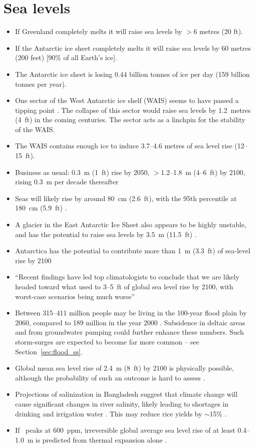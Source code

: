 \documentclass[11pt]{article}
\begin{document}
\section{Sea levels}
\begin{itemize}
\item If Greenland completely melts it will raise sea levels by $>$6 metres (20 ft).
\item If the Antarctic ice sheet completely melts it will raise sea levels by 60 metres (200 feet) [90\% of all Earth's ice].
\item The Antarctic ice sheet is losing 0.44 billion tonnes of ice per day (159 billion tonnes per year). \cite{Mcmillan14} 
\item One sector of the West Antarctic ice shelf (WAIS) seems to have passed a tipping point \cite{Rignot14}. The collapse of this sector would raise sea levels by 1.2~metres (4~ft) in the coming centuries. The sector acts as a linchpin for the stability of the WAIS.
\item The WAIS contains enough ice to induce 3.7--4.6 metres of sea level rise (12--15~ft).
\item Business as usual: 0.3~m (1~ft) rise by 2050, $>$1.2--1.8~m (4--6~ft) by 2100, rising 0.3~m per decade thereafter
\item Seas will likely rise by around 80~cm (2.6~ft), with the 95th percentile at 180~cm (5.9~ft) \cite{Jevrejeva14}.
\item A glacier in the East Antarctic Ice Sheet also appears to be highly unstable, and has the potential to raise sea levels by 3.5~m (11.5~ft) \cite{Greenbaum15}.
\item Antarctica has the potential to contribute more than 1~m (3.3~ft) of sea-level rise by 2100 \cite{Deconto16}
\item ``Recent findings have led top climatologists to conclude that we are likely headed toward what used to 3--5~ft of global sea level rise by 2100, with worst-case scenarios being much worse'' \cite{Romm18}
\item Between 315--411 million people may be living in the 100-year flood plain by 2060, compared to 189 million in the year 2000 \cite{Neumann15}. Subsidence in deltaic areas and from groundwater pumping could further enhance these numbers. Such storm-surges are expected to become far more common -- see Section~\ref{sec:flood_ss}.
\item Global mean sea level rise of 2.4~m (8~ft) by 2100 is physically possible, although the probability of such an outcome is hard to assess \cite{Wuebbles17}.
\item Projections of salinization in Bangladesh suggest that climate change will cause significant changes in river salinity, likely leading to shortages in drinking and irrigation water \cite{Dasgupta15}. This may reduce rice yields by $\sim$15\% \cite{Dasgupta14}.
\item If \cotwo\ peaks at 600~ppm, irreversible global average sea level rise of at least 0.4--1.0~m is predicted from thermal expansion alone \cite{Solomon09}.
\end{itemize}
\end{document}
